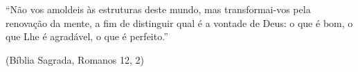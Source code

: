 ``Não vos amoldeis às estruturas deste mundo, mas transformai-vos pela renovação da mente, a fim de distinguir qual é a vontade de Deus: o que é bom, o que Lhe é agradável, o que é perfeito.''

(Bíblia Sagrada, Romanos 12, 2)